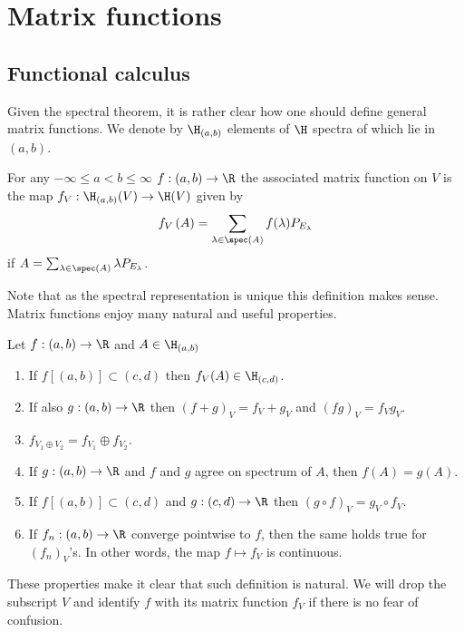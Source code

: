 \section{Matrix functions}

\subsection{Functional calculus}

Given the spectral theorem, it is rather clear how one should define general matrix functions. We denote by $\H_{(a, b)}$ elements of $\H$ spectra of which lie in $(a, b)$.

\begin{maar}
	For any $-\infty \leq a < b \leq \infty$ $f : (a, b) \to \R$ the associated matrix function on $V$ is the map $f_{V} : \H_{(a, b)}(V) \to \H(V)$ given by
	\begin{align*}
		f_{V}\left(A\right) = \sum_{\lambda \in \spec(A)} f(\lambda) P_{E_{\lambda}}
	\end{align*}
	if $A = \sum_{\lambda \in \spec(A)} \lambda P_{E_{\lambda}}$.
\end{maar}
Note that as the spectral representation is unique this definition makes sense. Matrix functions enjoy many natural and useful properties.

\begin{prop}\label{basic_matrix}
	Let $f : (a,b) \to \R$ and $A \in \H_{(a, b)}$
	\begin{enumerate}
		\item If $f[(a, b)] \subset (c, d)$ then $f_{V}(A) \in \H_{(c, d)}$.
		\item If also $g : (a, b) \to \R$ then $(f + g)_{V} = f_{V} + g_{V}$ and $(fg)_{V} = f_{V}g_{V}$.
		\item $f_{V_{1} \oplus V_{2}} = f_{V_{1}} \oplus f_{V_{2}}$.
		\item If $g : (a, b) \to \R$ and $f$ and $g$ agree on spectrum of $A$, then $f(A) = g(A)$.
		\item If $f[(a, b)] \subset (c, d)$ and $g : (c, d) \to \R$ then $(g \circ f)_{V} = g_{V} \circ f_{V}$.
		\item If $f_{n} : (a, b) \to \R$ converge pointwise to $f$, then the same holds true for $(f_{n})_{V}$'s. In other words, the map $f \mapsto f_{V}$ is continuous.
	\end{enumerate}
\end{prop}

These properties make it clear that such definition is natural. We will drop the subscript $V$ and identify $f$ with its matrix function $f_{V}$ if there is no fear of confusion.

